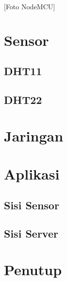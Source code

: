 \documentclass[
10pt, %
a4paper, %
oneside, %
headinclude,footinclude, %
BCOR5mm, %
]{scrartcl}
\begin{document}
[Foto NodeMCU]

\section{Sensor}
\subsection{DHT11}
\subsection{DHT22}

\section{Jaringan}

\section{Aplikasi}
\subsection{Sisi Sensor}
\subsection{Sisi Server}

\section{Penutup}



\renewcommand{\refname}{\spacedlowsmallcaps{References}} %



\end{document}
